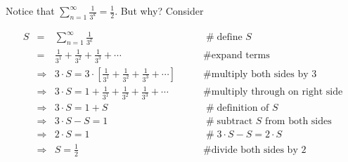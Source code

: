 \documentclass[11pt, oneside]{article}   	%
\begin{document}
Notice that  $\sum\limits_{n = 1}^\infty   \frac{1}{3^k}  = \frac{1}{2}$. But why? Consider 
      
\begin{equation*}
\begin{array}{lllll}
S
&=&   \sum\limits_{n = 1}^\infty   \frac{1}{3^k}                                                                         &\qquad  \mathrel{\#} \text{define $S$}                             \\ 
&=& \frac{1}{3^1} + \frac{1}{3^2} + \frac{1}{3^3} + \cdots                                                        &\qquad  \mathrel{\#} \text{expand terms}                         \\
&\Rightarrow& 3 \cdot S = 3 \cdot [\frac{1}{3^1} + \frac{1}{3^2} + \frac{1}{3^3} + \cdots ]      &\qquad  \mathrel{\#} \text{multiply both sides by 3}          \\
&\Rightarrow& 3 \cdot S = 1 + \frac{1}{3^1} + \frac{1}{3^2} + \frac{1}{3^3} + \cdots               &\qquad  \mathrel{\#} \text{multiply through on right side} \\
&\Rightarrow& 3 \cdot S = 1 + S                                                                                             &\qquad  \mathrel{\#} \text{definition of $S$}                      \\
&\Rightarrow& 3 \cdot S - S = 1                                                                                              &\qquad  \mathrel{\#} \text{subtract $S$ from both sides}  \\
&\Rightarrow& 2 \cdot S  = 1                                                                                                  &\qquad  \mathrel{\#} 3 \cdot S - S = 2 \cdot S                    \\
&\Rightarrow& S  = \frac{1}{2}                                                                                                &\qquad  \mathrel{\#} \text{divide both sides by 2} 
\end{array}
\end{equation*}
\end{document}
